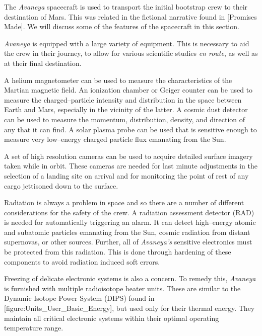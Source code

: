 

The {\it Avaneya} spacecraft is used to transport the initial bootstrap crew to their destination of Mars. This was related in the fictional narrative found in [Promises Made]. We will discuss some of the features of the spacecraft in this section.

{\it Avaneya} is equipped with a large variety of equipment. This is necessary to aid the crew in their journey, to allow for various scientific studies {\it en route}, as well as at their final destination.

A helium magnetometer can be used to measure the characteristics of the Martian magnetic field. An ionization chamber or Geiger counter can be used to measure the charged--particle intensity and distribution in the space between Earth and Mars, especially in the vicinity of the latter. A cosmic dust detector can be used to measure the momentum, distribution, density, and direction of any that it can find. A solar plasma probe can be used that is sensitive enough to measure very low--energy charged particle flux emanating from the Sun.

A set of high resolution cameras can be used to acquire detailed surface imagery taken while in orbit. These cameras are needed for last minute adjustments in the selection of a landing site on arrival and for monitoring the point of rest of any cargo jettisoned down to the surface.

Radiation is always a problem in space and so there are a number of different considerations for the safety of the crew. A radiation assessment detector (RAD) is needed for automatically triggering an alarm. It can detect high--energy atomic and subatomic particles emanating from the Sun, cosmic radiation from distant supernovas, or other sources. Further, all of {\it Avaneya's} sensitive electronics must be protected from this radiation. This is done through hardening of these components to avoid radiation induced soft errors.

Freezing of delicate electronic systems is also a concern. To remedy this, {\it Avaneya} is furnished with multiple radioisotope heater units. These are similar to the Dynamic Isotope Power System (DIPS) found in [figure:Units_User_Basic_Energy], but used only for their thermal energy. They maintain all critical electronic systems within their optimal operating temperature range.

